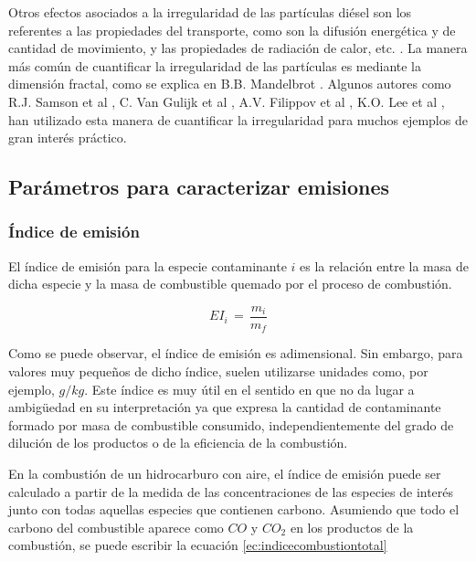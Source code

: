 Otros efectos asociados a la irregularidad de las partículas diésel son los referentes a las propiedades del transporte, como son la difusión energética y de cantidad de movimiento, y las propiedades de radiación de calor, etc. \cite{meakinetal:1989}. 
La manera más común de cuantificar la irregularidad de las partículas es mediante la dimensión fractal, como se explica en B.B. Mandelbrot \cite{mandelbrot:1983}. Algunos autores como R.J. Samson et al \cite{samsometal:1987}, C. Van Gulijk et al \cite{vangulijketal:2004}, A.V. Filippov et al \cite{filippovetal:2000}, K.O. Lee et al \cite{leeetal:2003}, han utilizado esta manera de cuantificar la irregularidad para muchos ejemplos de gran interés práctico.

\subsection{Parámetros para caracterizar emisiones} \label{sub:parametroscaracterizaremisiones}

\subsubsection{Índice de emisión}

\par El índice de emisión para la especie contaminante $i$ es la relación entre la masa de dicha especie y la masa de combustible quemado por el proceso de combustión.

\begin{equation}
\label{ec:indiceemision}
EI_i\,=\, \dfrac{m_i}{m_f}
\end{equation}

\par Como se puede observar, el índice de emisión es adimensional. Sin embargo, para valores muy pequeños de dicho índice, suelen utilizarse unidades como, por ejemplo, $g/kg$. Este índice es muy útil en el sentido en que no da lugar a ambigüedad en su interpretación ya que expresa la cantidad de contaminante formado por masa de combustible consumido, independientemente del grado de dilución de los productos o de la eficiencia de la combustión.

\par En la combustión de un hidrocarburo con aire, el índice de emisión puede ser calculado a partir de la medida de las concentraciones de las especies de interés junto con todas aquellas especies que contienen carbono. Asumiendo que todo el carbono del combustible aparece como $CO$ y $CO_2$ en los productos de la combustión, se puede escribir la ecuación \ref{ec:indicecombustiontotal}

